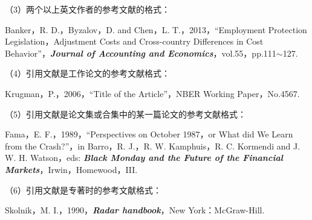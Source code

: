 \documentclass{article}
\begin{document}
（3）两个以上英文作者的参考文献的格式：

Banker，R. D.，Byzalov，D. and Chen，L. T.，2013，“Employment Protection
Legislation，Adjustment Costs and Cross-country Differences in Cost Behavior”，\textbf{\textit{Journal
of Accounting and Economics}}，vol.55，pp.111$\sim$127.

（4）引用文献是工作论文的参考文献格式：

Krugman，P.，2006，“Title of the Article”，NBER Working Paper，No.4567.


（5）引用文献是论文集或合集中的某一篇论文的参考文献格式：

Fama，E. F.，1989，“Perspectives on October 1987，or What did We Learn from the
Crash?”，in Barro，R. J.，R. W. Kamphuis，R. C. Kormendi and J. W. H. Watson，eds:
\textbf{\textit{Black Monday and the Future of the Financial Markets}}，Irwin，Homewood，III.

（6）引用文献是专著时的参考文献格式：

Skolnik，M. I.，1990，\textbf{\textit{Radar handbook}}，New York：McGraw-Hill.

\newpage
{
    \printbibliography

}

    
\end{document}
